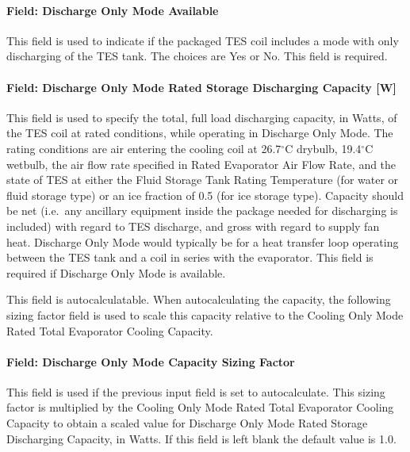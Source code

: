\paragraph{Field: Discharge Only Mode Available}\label{field-discharge-only-mode-available}

This field is used to indicate if the packaged TES coil includes a mode with only discharging of the TES tank. The choices are Yes or No. This field is required.

\paragraph{Field: Discharge Only Mode Rated Storage Discharging Capacity {[}W{]}}\label{field-discharge-only-mode-rated-storage-discharging-capacity-w}

This field is used to specify the total, full load discharging capacity, in Watts, of the TES coil at rated conditions, while operating in Discharge Only Mode. The rating conditions are air entering the cooling coil at 26.7$^\circ$C drybulb, 19.4$^\circ$C wetbulb, the air flow rate specified in Rated Evaporator Air Flow Rate, and the state of TES at either the Fluid Storage Tank Rating Temperature (for water or fluid storage type) or an ice fraction of 0.5 (for ice storage type). Capacity should be net (i.e.~any ancillary equipment inside the package needed for discharging is included) with regard to TES discharge, and gross with regard to supply fan heat. Discharge Only Mode would typically be for a heat transfer loop operating between the TES tank and a coil in series with the evaporator. This field is required if Discharge Only Mode is available.

This field is autocalculatable. When autocalculating the capacity, the following sizing factor field is used to scale this capacity relative to the Cooling Only Mode Rated Total Evaporator Cooling Capacity.

\paragraph{Field: Discharge Only Mode Capacity Sizing Factor}\label{field-discharge-only-mode-capacity-sizing-factor}

This field is used if the previous input field is set to autocalculate. This sizing factor is multiplied by the Cooling Only Mode Rated Total Evaporator Cooling Capacity to obtain a scaled value for Discharge Only Mode Rated Storage Discharging Capacity, in Watts. If this field is left blank the default value is 1.0.

